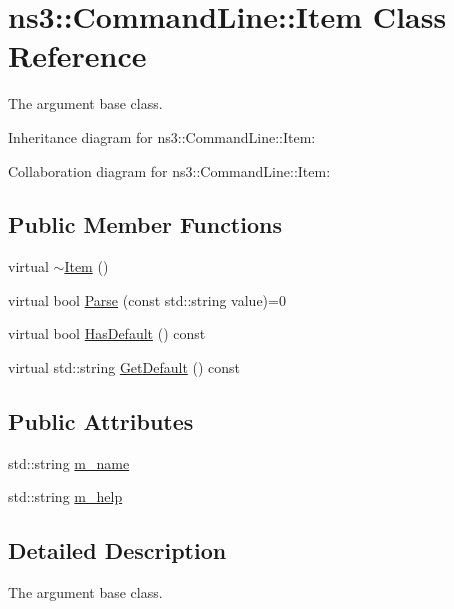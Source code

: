 \hypertarget{classns3_1_1CommandLine_1_1Item}{}\section{ns3\+:\+:Command\+Line\+:\+:Item Class Reference}
\label{classns3_1_1CommandLine_1_1Item}


The argument base class.  




Inheritance diagram for ns3\+:\+:Command\+Line\+:\+:Item\+:


Collaboration diagram for ns3\+:\+:Command\+Line\+:\+:Item\+:
\subsection*{Public Member Functions}
\begin{DoxyCompactItemize}
\item 
virtual \hyperlink{classns3_1_1CommandLine_1_1Item_a167ecb87d704a836d852a0e0bb814dd1}{$\sim$\+Item} ()
\item 
virtual bool \hyperlink{classns3_1_1CommandLine_1_1Item_a2b620dffea92212a6151e6ab489ece96}{Parse} (const std\+::string value)=0
\item 
virtual bool \hyperlink{classns3_1_1CommandLine_1_1Item_a77d3ef1beb66b96f8bbb205881e5b4af}{Has\+Default} () const 
\item 
virtual std\+::string \hyperlink{classns3_1_1CommandLine_1_1Item_ae44db5ebeb80f7e211bb968139d24ec7}{Get\+Default} () const 
\end{DoxyCompactItemize}
\subsection*{Public Attributes}
\begin{DoxyCompactItemize}
\item 
std\+::string \hyperlink{classns3_1_1CommandLine_1_1Item_a9fe81cd5f78b2c1f6ca7951fbc573506}{m\+\_\+name}
\item 
std\+::string \hyperlink{classns3_1_1CommandLine_1_1Item_ae54cd153e6d77da544f1e22d876346bb}{m\+\_\+help}
\end{DoxyCompactItemize}


\subsection{Detailed Description}
The argument base class. 

